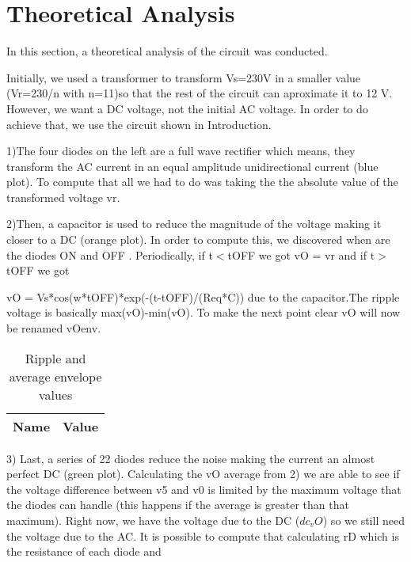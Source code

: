 \section{Theoretical Analysis} \label{section:theo}


\par In this section, a theoretical analysis of the circuit was conducted.

Initially, we used a transformer to transform Vs=230V in a smaller value (Vr=230/n with n=11)so that the rest of the circuit can aproximate it to 12 V. However, we want a DC voltage, not the initial AC voltage. In order to do achieve that, we use the circuit shown in Introduction.

1)The four diodes on the left are a full wave rectifier which means, they transform the AC current in an equal amplitude unidirectional current (blue plot). To compute that all we had to do was taking the the absolute value of the transformed voltage vr.



2)Then, a capacitor is used to reduce the magnitude of the voltage making it closer to a DC (orange plot). In order to compute this, we discovered when are the diodes ON and OFF . Periodically, if t$<$tOFF we got vO = vr and if t$>$tOFF we got 
\par vO = Vs*cos(w*tOFF)*exp(-(t-tOFF)/(Req*C)) due to the capacitor.The ripple voltage is basically max(vO)-min(vO). To make the next point clear vO will now be renamed vOenv.

\begin{table}[ht]
  \centering
  \begin{tabular}{|l|r|}
    \hline    
    {\bf Name} & {\bf Value} \\ \hline
    
  \end{tabular}
  \caption{Ripple and average envelope values}
  \label{tab:p2}
\end{table}


3) Last, a series of 22 diodes reduce the noise making the current an almost perfect DC (green plot). Calculating the vO average from 2) we are able to see if the voltage difference between v5 and v0 is limited by the maximum voltage that the diodes can handle (this happens if the average is greater than that maximum). Right now, we have the voltage due to the DC ($dc_vO$) so we still need the voltage due to the AC. It is possible to compute that calculating rD which is the resistance of each diode and 

